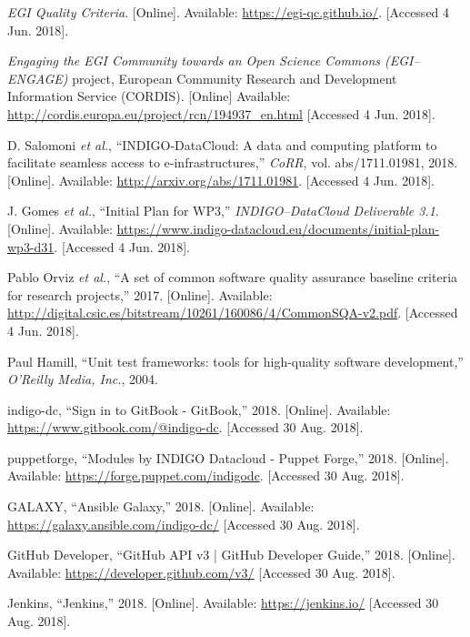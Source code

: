 \documentclass[journal]{IEEEtran}
\begin{document}
\begin{thebibliography}{1}
\emph{EGI Quality Criteria}.
[Online]. Available: \url{https://egi-qc.github.io/}.
[Accessed 4 Jun. 2018].

\emph{Engaging the EGI Community towards an Open Science Commons (EGI--ENGAGE)}
project, European Community Research and Development Information Service (CORDIS).
[Online] Available: \url{http://cordis.europa.eu/project/rcn/194937_en.html}
[Accessed 4 Jun. 2018].

D. Salomoni \emph{et al.},
``INDIGO-DataCloud: A data and computing platform to facilitate seamless access to e-infrastructures,''
\emph{CoRR},
vol. abs/1711.01981, 2018.
[Online]. Available: \url{http://arxiv.org/abs/1711.01981}.
[Accessed 4 Jun. 2018].






J. Gomes \emph{et al.},
``Initial Plan for WP3,''
\emph{INDIGO--DataCloud Deliverable 3.1}.
[Online]. Available: \url{https://www.indigo-datacloud.eu/documents/initial-plan-wp3-d31}.
[Accessed 4 Jun. 2018].

Pablo Orviz \emph{et al.},
``A set of common software quality assurance baseline criteria for research projects,''
2017.
[Online]. Available: \url{http://digital.csic.es/bitstream/10261/160086/4/CommonSQA-v2.pdf}.
[Accessed 4 Jun. 2018].

Paul Hamill,
``Unit test frameworks: tools for high-quality software development,''
\emph{O'Reilly Media, Inc.},
2004.


indigo-dc, ``Sign in to GitBook - GitBook,''
2018.
[Online]. Available: \url{https://www.gitbook.com/@indigo-dc}.
[Accessed 30 Aug. 2018].

puppetforge, ``Modules by INDIGO Datacloud - Puppet Forge,''
2018.
[Online]. Available: \url{https://forge.puppet.com/indigodc}.
[Accessed 30 Aug. 2018].

GALAXY, ``Ansible Galaxy,''
2018.
[Online]. Available: \url{https://galaxy.ansible.com/indigo-dc/}
[Accessed 30 Aug. 2018].

GitHub Developer, ``GitHub API v3 | GitHub Developer Guide,''
2018.
[Online]. Available: \url{https://developer.github.com/v3/}
[Accessed 30 Aug. 2018].


Jenkins, ``Jenkins,''
2018.
[Online]. Available: \url{https://jenkins.io/}
[Accessed 30 Aug. 2018].


\end{thebibliography}
\end{document}
